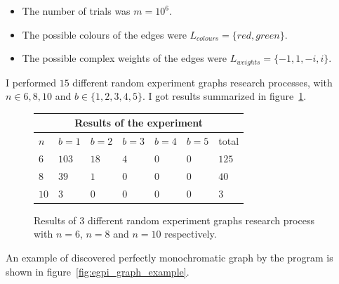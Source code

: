 \begin{itemize}
    \item The number of trials was $m = 10^6$.
    \item The possible colours of the edges were $L_{colours} = \{red, green\}$.
    \item The possible complex weights of the edges were $L_{weights} = \{-1, 1, -i, i\}$.
\end{itemize}

I performed $15$ different random experiment graphs research processes, with $n \in {6, 8, 10}$ and $b \in \{1, 2, 3, 4, 5\}$.
I got results summarized in figure~\ref{fig:results-experiment}.

\begin{figure}[H]
    \centering
    \begin{tabular}{ |p{1cm}||p{1.5cm}|p{1.5cm}|p{1.5cm}|p{1.5cm}|p{1.5cm}|p{1.5cm}|  }
        \hline
        \multicolumn{7}{|c|}{Results of the experiment} \\
        \hline
        $n$ & $b = 1$ & $b = 2$ & $b = 3$ & $b = 4$ & $b = 5$ & total \\
        \hline
        $6 $ & $103$ & $18$ & $4$ & $0$ & $0$ & $125$ \\
        $8 $ & $39$  & $1$  & $0$ & $0$ & $0$ & $40$  \\
        $10$ & $3$   & $0$  & $0$ & $0$ & $0$ & $3$   \\
        \hline
    \end{tabular}
    \caption{Results of $3$ different random experiment graphs research process with $n=6$, $n=8$ and $n=10$ respectively.}
    \label{fig:results-experiment}
\end{figure}

An example of discovered perfectly monochromatic graph by the program is shown in figure~\ref{fig:egpi_graph_example}.

